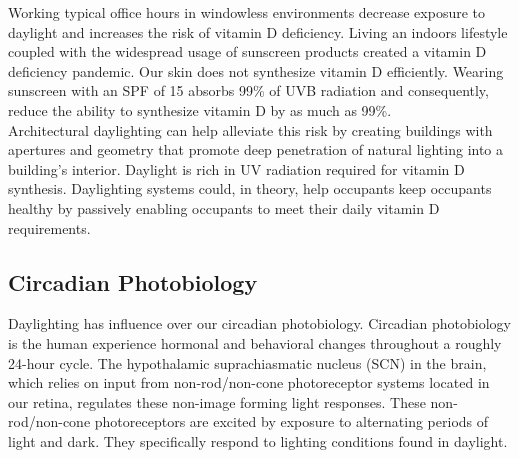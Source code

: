 		Working typical office hours in windowless environments decrease exposure to daylight and increases the risk of vitamin D deficiency. Living an indoors lifestyle coupled with the widespread usage of sunscreen products created a vitamin D deficiency pandemic.  Our skin does not synthesize vitamin D efficiently. Wearing sunscreen with an SPF of 15 absorbs 99\% of UVB radiation and consequently, reduce the ability to synthesize vitamin D by as much as 99\%\cite{Holick}. \\

		Architectural daylighting can help alleviate this risk by creating buildings with apertures and geometry that promote deep penetration of natural lighting into a building's interior. Daylight is rich in UV radiation required for vitamin D synthesis.  Daylighting systems could, in theory, help occupants keep occupants healthy by passively enabling occupants to meet their daily vitamin D requirements. \\

	\subsection{Circadian Photobiology}
		Daylighting has influence over our circadian photobiology. Circadian photobiology is the human experience hormonal and behavioral changes throughout a roughly 24-hour cycle. The hypothalamic suprachiasmatic nucleus (SCN)  in the brain, which relies on input from non-rod/non-cone photoreceptor systems located in our retina, regulates these non-image forming light responses. These non-rod/non-cone photoreceptors are excited by exposure to alternating periods of light and dark. They specifically respond to lighting conditions found in daylight\cite{Rea,Thapan}.\\


